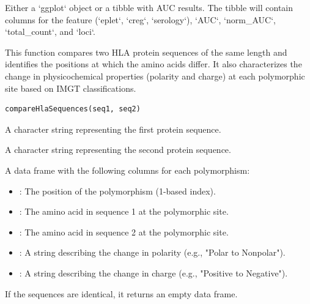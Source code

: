 \documentclass[letterpaper]{book}
\begin{document}
%
\begin{Value}
Either a `ggplot` object or a tibble with AUC results. The tibble
will contain columns for the feature (`eplet`, `creg`, `serology`), `AUC`,
`norm\_AUC`, `total\_count`, and `loci`.
\end{Value}
%
\begin{Description}
This function compares two HLA protein sequences of the same length and
identifies the positions at which the amino acids differ. It also
characterizes the change in physicochemical properties (polarity and charge)
at each polymorphic site based on IMGT classifications.
\end{Description}
%
\begin{Usage}
\begin{verbatim}
compareHlaSequences(seq1, seq2)
\end{verbatim}
\end{Usage}
%
\begin{Arguments}
\begin{ldescription}
\item[\code{seq1}] A character string representing the first protein sequence.

\item[\code{seq2}] A character string representing the second protein sequence.
\end{ldescription}
\end{Arguments}
%
\begin{Value}
A data frame with the following columns for each polymorphism:
\begin{itemize}

\item{} : The position of the polymorphism (1-based index).
\item{} : The amino acid in sequence 1 at the polymorphic site.
\item{} : The amino acid in sequence 2 at the polymorphic site.
\item{} : A string describing the change in polarity (e.g., "Polar to Nonpolar").
\item{} : A string describing the change in charge (e.g., "Positive to Negative").

\end{itemize}

If the sequences are identical, it returns an empty data frame.
\end{Value}
\end{document}
